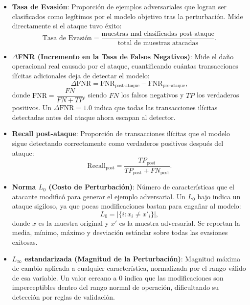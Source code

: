 \begin{itemize}
    \item \textbf{Tasa de Evasión}: Proporción de ejemplos adversariales que logran ser clasificados como legítimos por el modelo objetivo tras la perturbación. Mide directamente si el ataque tuvo éxito:
    \[
    \text{Tasa de Evasión} = \frac{\text{muestras mal clasificadas post-ataque}}{\text{total de muestras atacadas}}.
    \]

    \item \textbf{$\Delta$FNR (Incremento en la Tasa de Falsos Negativos)}: Mide el daño operacional real causado por el ataque, cuantificando cuántas transacciones ilícitas adicionales deja de detectar el modelo:
    \[
    \Delta\text{FNR} = \text{FNR}_{\text{post-ataque}} - \text{FNR}_{\text{pre-ataque}},
    \]
    donde $\text{FNR} = \dfrac{FN}{FN + TP}$, siendo $FN$ los falsos negativos y $TP$ los verdaderos positivos. Un $\Delta\text{FNR} = 1.0$ indica que todas las transacciones ilícitas detectadas antes del ataque ahora escapan al detector.

    \item \textbf{Recall post-ataque}: Proporción de transacciones ilícitas que el modelo sigue detectando correctamente como verdaderos positivos después del ataque:
    \[
    \text{Recall}_{\text{post}} = \frac{TP_{\text{post}}}{TP_{\text{post}} + FN_{\text{post}}}.
    \]

    \item \textbf{Norma $L_0$ (Costo de Perturbación)}: Número de características que el atacante modificó para generar el ejemplo adversarial. Un $L_0$ bajo indica un ataque sigiloso, ya que pocas modificaciones bastan para engañar al modelo:
    \[
    L_0 = \left|\{ i : x_i \neq x'_i \}\right|,
    \]
    donde $x$ es la muestra original y $x'$ es la muestra adversarial. Se reportan la media, mínimo, máximo y desviación estándar sobre todas las evasiones exitosas.

    \item \textbf{$L_\infty$ estandarizada (Magnitud de la Perturbación)}:
    Magnitud máxima de cambio aplicada a cualquier característica, normalizada por el rango válido de esa variable. Un valor cercano a 0 indica que las modificaciones son imperceptibles dentro del rango normal de operación, dificultando su detección por reglas de validación.
\end{itemize}
